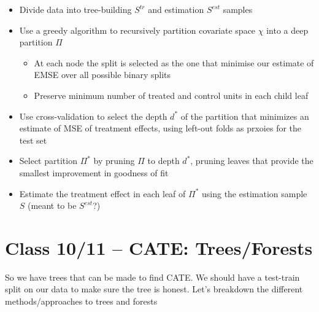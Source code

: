 \documentclass{article}
\begin{document}
\begin{itemize}
    \item Divide data into tree-building $S^{tr}$ and estimation $S^{est}$ samples
    \item Use a greedy algorithm to recursively partition covariate space $\chi$ into a deep partition $\Pi$
    \begin{itemize}
        \item At each node the split is selected as the one that minimise our estimate of EMSE over all possible binary splits
        \item Preserve minimum number of treated and control units in each child leaf
    \end{itemize}
    \item Use cross-validation to select the depth $d^*$ of the partition that minimizes an estimate of MSE of treatment effects, using left-out folds as prxoies for the test set
    \item Select partition $\Pi^*$ by pruning $\Pi$ to depth $d^{*}$, pruning leaves that provide the smallest improvement in goodness of fit
    \item Estimate the treatment effect in each leaf of $\Pi^*$ using the estimation sample $S$ (meant to be $S^{est}$?)
\end{itemize}

\section{Class 10/11 -- CATE: Trees/Forests}

So we have trees that can be made to find CATE. We should have a test-train split on our data to make sure the tree is honest. Let's breakdown the different methods/approaches to trees and forests
\end{document}
